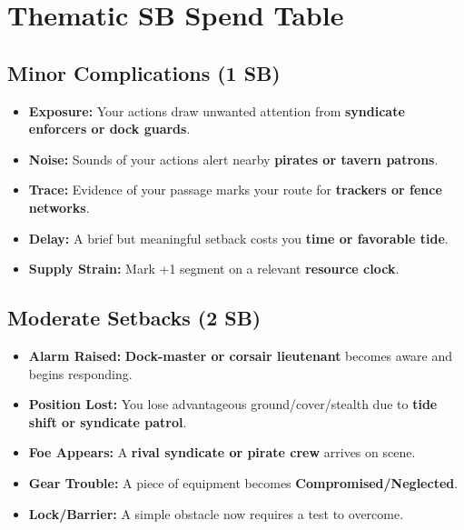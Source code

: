 
\section*{Thematic SB Spend Table}
\label{sec:zakov-sb}

\subsection*{Minor Complications (1 SB)}
\begin{itemize}
\item \textbf{Exposure:} Your actions draw unwanted attention from \textbf{syndicate enforcers or dock guards}.
\item \textbf{Noise:} Sounds of your actions alert nearby \textbf{pirates or tavern patrons}.
\item \textbf{Trace:} Evidence of your passage marks your route for \textbf{trackers or fence networks}.
\item \textbf{Delay:} A brief but meaningful setback costs you \textbf{time or favorable tide}.
\item \textbf{Supply Strain:} Mark +1 segment on a relevant \textbf{resource clock}.
\end{itemize}

\subsection*{Moderate Setbacks (2 SB)}
\begin{itemize}
\item \textbf{Alarm Raised:} \textbf{Dock-master or corsair lieutenant} becomes aware and begins responding.
\item \textbf{Position Lost:} You lose advantageous ground/cover/stealth due to \textbf{tide shift or syndicate patrol}.
\item \textbf{Foe Appears:} A \textbf{rival syndicate or pirate crew} arrives on scene.
\item \textbf{Gear Trouble:} A piece of equipment becomes \textbf{Compromised/Neglected}.
\item \textbf{Lock/Barrier:} A simple obstacle now requires a test to overcome.
\end{itemize}

